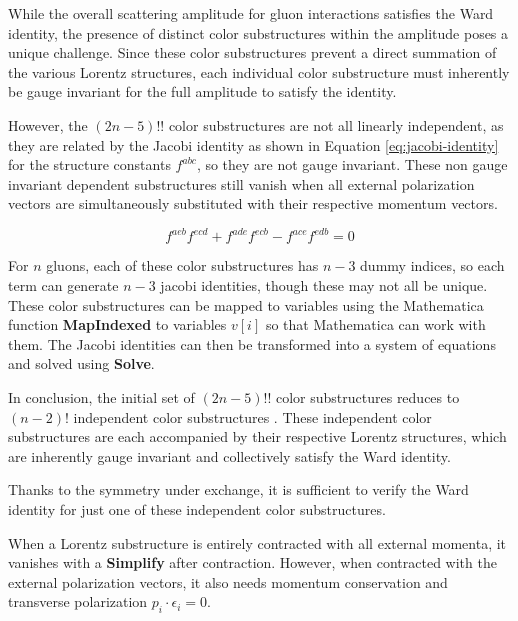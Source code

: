 \documentclass[main.tex]{subfiles}
\begin{document}
While the overall scattering amplitude for gluon interactions satisfies the Ward identity, the presence of distinct color substructures 
within the amplitude poses a unique challenge. Since these color substructures prevent a direct summation of the various 
Lorentz structures, each individual color substructure must inherently be gauge invariant for the full amplitude to satisfy the identity.

However, the $(2n-5)!!$ color substructures are not all linearly independent, as they are related by the Jacobi identity as shown in Equation \cref{eq:jacobi-identity} for the structure constants $f^{abc}$, so 
they are not gauge invariant. These non gauge invariant dependent substructures still vanish when all external polarization vectors are simultaneously substituted with their respective momentum vectors.

\begin{equation} \label{eq:jacobi-identity}
    f^{aeb}f^{ecd} + f^{ade}f^{ecb} - f^{ace}f^{edb} = 0
\end{equation}

For $n$ gluons, each of these color substructures has $n-3$ dummy indices, so each term can generate $n-3$ jacobi identities, though these may not all be unique.
These color substructures can be mapped to variables using the Mathematica function \textbf{MapIndexed} to variables $v[i]$ so that Mathematica can work with them.
The Jacobi identities can then be transformed into a system of equations and solved using \textbf{Solve}.

In conclusion, the initial set of $(2n-5)!!$ color substructures reduces to $(n-2)!$ independent color substructures \cite{DELDUCA200051}.
These independent color substructures are each accompanied by their respective Lorentz structures, which are inherently gauge invariant and collectively satisfy the Ward identity.

Thanks to the symmetry under exchange, it is sufficient to verify the Ward identity for just one of these independent color substructures.

When a Lorentz substructure is entirely contracted with all external momenta, it vanishes with a \textbf{Simplify} after contraction. 
However, when contracted with the external polarization vectors, it also needs momentum conservation and transverse polarization $p_i\cdot \epsilon_i = 0$.
\end{document}
